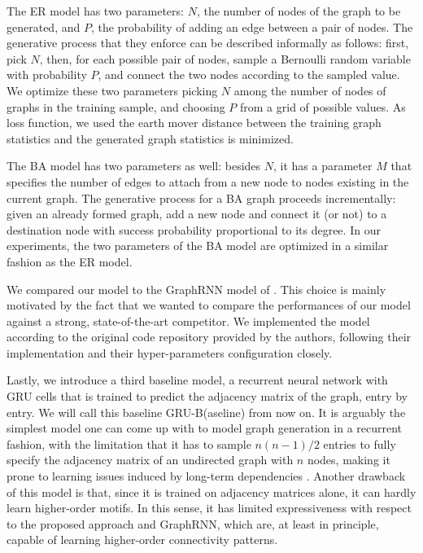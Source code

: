 The ER model has two parameters: $N$, the number of nodes of the graph to be generated, and $P$, the probability of adding an edge between a pair of nodes. The generative process that they enforce can be described informally as follows: first, pick $N$, then, for each possible pair of nodes, sample a Bernoulli random variable with probability $P$, and connect the two nodes according to the sampled value. We optimize these two parameters picking $N$ among the number of nodes of graphs in the training sample, and choosing $P$ from a grid of possible values. As loss function, we used the earth mover distance between the training graph statistics and the generated graph statistics is minimized.


The BA model has two parameters as well: besides $N$, it has a parameter $M$ that specifies the number of edges to attach from a new node to nodes existing in the current graph. The generative process for a BA graph proceeds incrementally: given an already formed graph, add a new node and connect it (or not) to  a destination node with success probability proportional to its degree. In our experiments, the two parameters of the BA model are optimized in a similar fashion as the ER model.

We compared our model to the GraphRNN model of \citet{you2018graphrnn}. This choice is mainly motivated by the fact that we wanted to compare the performances of our model against a strong, state-of-the-art competitor. We implemented the model according to the original code repository provided by the authors, following their implementation and their hyper-parameters configuration closely.

Lastly, we introduce a third baseline model, a recurrent neural network with GRU cells that is trained to predict the adjacency matrix of the graph, entry by entry. We will call this baseline GRU-B(aseline) from now on. It is arguably the simplest model one can come up with to model graph generation in a recurrent fashion, with the limitation that it has to sample $n(n-1)/2$ entries to fully specify the adjacency matrix of an undirected graph with $n$ nodes, making it prone to learning issues induced by long-term dependencies \citep{bengio1994learninglongtermdependenciesdifficult}. Another drawback of this model is that, since it is trained on adjacency matrices alone, it can hardly learn higher-order motifs. In this sense, it has limited expressiveness with respect to the proposed approach and GraphRNN, which are, at least in principle, capable of learning higher-order connectivity patterns.

